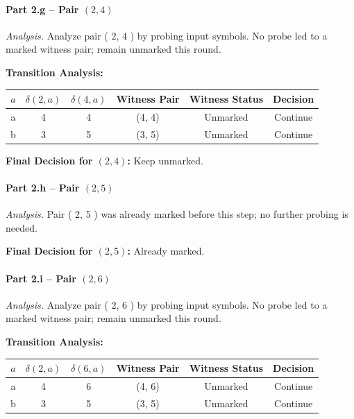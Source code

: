 \documentclass{article}
\begin{document}
\vspace{0.75em}
\paragraph{Part 2.g \;–\; Pair $( 2, 4 )$}

\emph{Analysis.} Analyze pair ( 2, 4 ) by probing input symbols. No probe led to a marked witness pair; remain unmarked this round.

\noindent\textbf{Transition Analysis:}
\begin{center}
\begin{tabular}{c c c c c c}
\hline
$a$ & $\delta(2,a)$ & $\delta(4,a)$ & Witness Pair & Witness Status & Decision \\
\hline
a & 4 & 4 &
(4, 4) &
Unmarked &
Continue \\
b & 3 & 5 &
(3, 5) &
Unmarked &
Continue \\
\hline
\end{tabular}
\end{center}



\noindent\textbf{Final Decision for $( 2, 4 )$:} Keep unmarked.

\vspace{0.75em}
\paragraph{Part 2.h \;–\; Pair $( 2, 5 )$}

\emph{Analysis.} Pair ( 2, 5 ) was already marked before this step; no further probing is needed.

\noindent\textbf{Final Decision for $( 2, 5 )$:} Already marked.

\vspace{0.75em}
\paragraph{Part 2.i \;–\; Pair $( 2, 6 )$}

\emph{Analysis.} Analyze pair ( 2, 6 ) by probing input symbols. No probe led to a marked witness pair; remain unmarked this round.

\noindent\textbf{Transition Analysis:}
\begin{center}
\begin{tabular}{c c c c c c}
\hline
$a$ & $\delta(2,a)$ & $\delta(6,a)$ & Witness Pair & Witness Status & Decision \\
\hline
a & 4 & 6 &
(4, 6) &
Unmarked &
Continue \\
b & 3 & 5 &
(3, 5) &
Unmarked &
Continue \\
\hline
\end{tabular}
\end{center}
\end{document}

